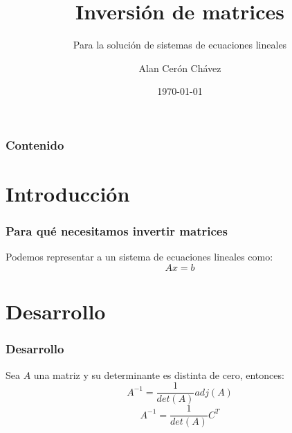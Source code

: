 \documentclass{beamer}
\title{Inversión de matrices}
\subtitle{Para la solución de sistemas de ecuaciones lineales}
\author{Alan Cerón Chávez}
\institute{FES Acatlán - UNAM}
\date{\today}
\begin{document}
    \begin{frame}
        \titlepage
    \end{frame}
    \begin{frame}
        \frametitle{Contenido}
        \tableofcontents
    \end{frame}
    \section{Introducción}
    \begin{frame}
        \frametitle{Para qué necesitamos invertir matrices}
        Podemos representar a un sistema de ecuaciones lineales como:
        $$
        Ax = b
        $$
    \end{frame}
    \section{Desarrollo}
    \begin{frame}
        \frametitle{Desarrollo}
        Sea $A$ una matriz y su determinante es distinta de cero, entonces:
        $$
        A^{-1} = \frac{1}{det(A)}adj(A)
        $$
        $$
        A^{-1} = \frac{1}{det(A)}C^{T}
        $$

    \end{frame}
\end{document}
